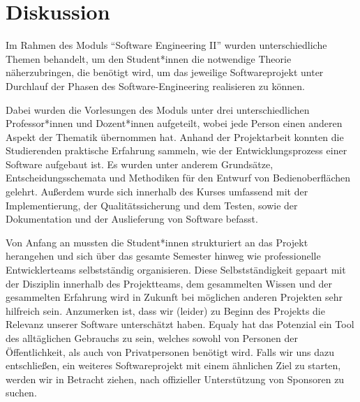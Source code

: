 \section{Diskussion}
\label{sec:diskussion}

Im Rahmen des Moduls ``Software Engineering II'' wurden unterschiedliche Themen behandelt, um den Student*innen die notwendige Theorie näherzubringen, die benötigt wird, um das jeweilige Softwareprojekt unter Durchlauf der Phasen des Software-Engineering realisieren zu können.

Dabei wurden die Vorlesungen des Moduls unter drei unterschiedlichen Professor*innen und Dozent*innen aufgeteilt, wobei jede Person einen anderen Aspekt der Thematik übernommen hat. Anhand der Projektarbeit konnten die Studierenden praktische Erfahrung sammeln, wie der Entwicklungsprozess einer Software aufgebaut ist. Es wurden unter anderem Grundsätze, Entscheidungsschemata und Methodiken für den Entwurf von Bedienoberflächen gelehrt. Außerdem wurde sich innerhalb des Kurses umfassend mit der Implementierung, der Qualitätssicherung und dem Testen, sowie der Dokumentation und der Auslieferung von Software befasst.

Von Anfang an mussten die Student*innen strukturiert an das Projekt herangehen und sich über das gesamte Semester hinweg wie professionelle Entwicklerteams selbstständig organisieren. Diese Selbstständigkeit gepaart mit der Disziplin innerhalb des Projektteams, dem gesammelten Wissen und der gesammelten Erfahrung wird in Zukunft bei möglichen anderen Projekten sehr hilfreich sein.
Anzumerken ist, dass wir (leider) zu Beginn des Projekts die Relevanz unserer Software unterschätzt haben. Equaly hat das Potenzial ein Tool des alltäglichen Gebrauchs zu sein, welches sowohl von Personen der Öffentlichkeit, als auch von Privatpersonen benötigt wird. Falls wir uns dazu entschließen, ein weiteres Softwareprojekt mit einem ähnlichen Ziel zu starten, werden wir in Betracht ziehen, nach offizieller Unterstützung von Sponsoren zu suchen.
